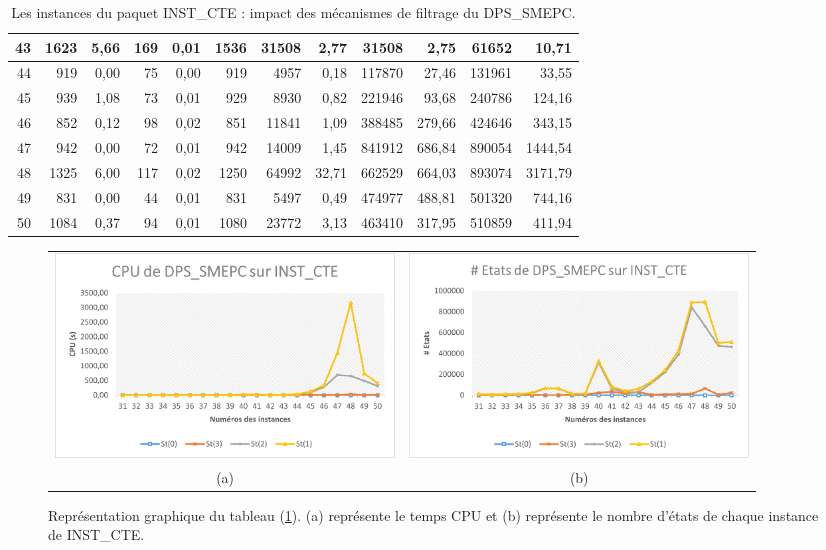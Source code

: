 \begin{table}[H]
\begin{tabular}{|r|rrrr|rrr|rr|rr|}
		43	&	1623	&	5,66	&	169	&	0,01	&	1536	&	31508	&	2,77	&	31508	&	2,75	&	61652	&	10,71	\\ \hline
		44	&	919	&	0,00	&	75	&	0,00	&	919	&	4957	&	0,18	&	117870	&	27,46	&	131961	&	33,55	\\ \hline
		45	&	939	&	1,08	&	73	&	0,01	&	929	&	8930	&	0,82	&	221946	&	93,68	&	240786	&	124,16	\\ \hline
		46	&	852	&	0,12	&	98	&	0,02	&	851	&	11841	&	1,09	&	388485	&	279,66	&	424646	&	343,15	\\ \hline
		47	&	942	&	0,00	&	72	&	0,01	&	942	&	14009	&	1,45	&	841912	&	686,84	&	890054	&	1444,54	\\ \hline
		48	&	1325	&	6,00	&	117	&	0,02	&	1250	&	64992	&	32,71	&	662529	&	664,03	&	893074	&	3171,79	\\ \hline
		49	&	831	&	0,00	&	44	&	0,01	&	831	&	5497	&	0,49	&	474977	&	488,81	&	501320	&	744,16	\\ \hline
		50	&	1084	&	0,37	&	94	&	0,01	&	1080	&	23772	&	3,13	&	463410	&	317,95	&	510859	&	411,94	\\ \hline
		
		\bottomrule
	\end{tabular}%
	\caption{Les instances du paquet INST\_CTE : impact des mécanismes de filtrage du DPS\_SMEPC.}
	\label{power_filter2}%
\end{table}%
\begin{figure}[H]
	\centering
	\begin{tabular}{c c}
		\includegraphics[width=9cm]{images_these/CPU_DPS_SMEPC_INST_CTE.pdf}&
		\includegraphics[width=9cm]{images_these/Etats_DPS_SMEPC_INST_CTE.pdf}
		\\
		(a) & (b)
	\end{tabular}
	\caption[Représentation graphique du CPU et du gap du tableau (\ref{power_filter2})]{Représentation graphique du tableau (\ref{power_filter2}). (a) représente le temps CPU et (b) représente le nombre d'états de chaque instance de INST\_CTE.}\label{gap_cpu_dps_smepc_INST_CTE}
\end{figure}

